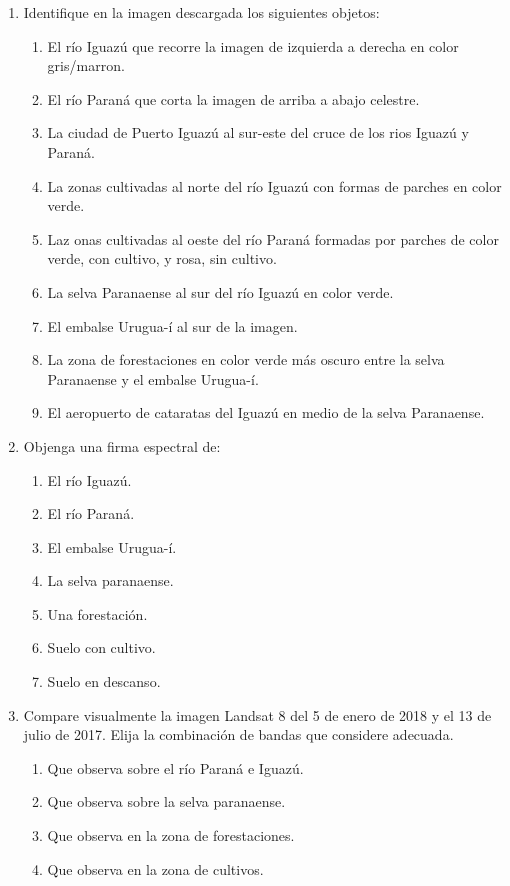 \begin{enumerate}
  \item Identifique en la imagen descargada los siguientes objetos:
  \begin{enumerate}
    \item El río Iguazú que recorre la imagen de izquierda a derecha en color gris/marron.
    \item El río Paraná que corta la imagen de arriba a abajo celestre.
    \item La ciudad de Puerto Iguazú al sur-este del cruce de los rios Iguazú y Paraná.
    \item La zonas cultivadas al norte del río Iguazú con formas de parches en color verde.
    \item Laz onas cultivadas al oeste del río Paraná formadas por parches de color verde, con cultivo, y rosa, sin cultivo.
    \item La selva Paranaense al sur del río Iguazú en color verde.
    \item El embalse Urugua-í al sur de la imagen.
    \item La zona de forestaciones en color verde más oscuro entre la selva Paranaense y el embalse Urugua-í.
    \item El aeropuerto de cataratas del Iguazú en medio de la selva Paranaense.
  \end{enumerate}

  \item Objenga una firma espectral de:
  \begin{enumerate}
    \item El río Iguazú.
    \item El río Paraná.
    \item El embalse Urugua-í.
    \item La selva paranaense.
    \item Una forestación.
    \item Suelo con cultivo.
    \item Suelo en descanso.
  \end{enumerate}

  \item Compare visualmente la imagen Landsat 8 del 5 de enero de 2018 y el 13 de julio de 2017. Elija la combinación de bandas que considere adecuada.
  \begin{enumerate}
    \item Que observa sobre el río Paraná e Iguazú.
    \item Que observa sobre la selva paranaense.
    \item Que observa en la zona de forestaciones.
    \item Que observa en la zona de cultivos.
  \end{enumerate}


\end{enumerate}
